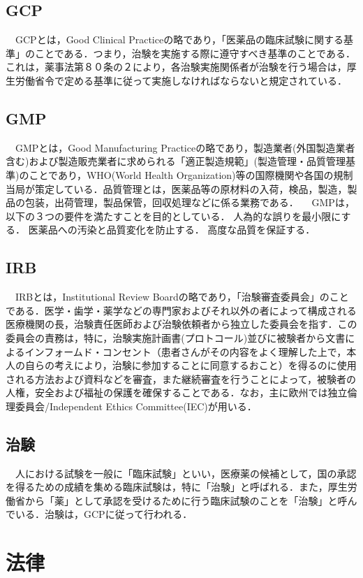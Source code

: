 \documentclass[uplatex,a4paper]{jsarticle}
\begin{document}
\subsection{GCP}
　GCPとは，Good Clinical Practiceの略であり，「医薬品の臨床試験に関する基準」のことである．つまり，治験を実施する際に遵守すべき基準のことである．これは，薬事法第８０条の２により，各治験実施関係者が治験を行う場合は，厚生労働省令で定める基準に従って実施しなければならないと規定されている．

\subsection{GMP}
　GMPとは，Good Manufacturing Practiceの略であり，製造業者(外国製造業者含む)および製造販売業者に求められる「適正製造規範」(製造管理・品質管理基準)のことであり，WHO(World Health Organization)等の国際機関や各国の規制当局が策定している．品質管理とは，医薬品等の原材料の入荷，検品，製造，製品の包装，出荷管理，製品保管，回収処理などに係る業務である．
　GMPは，以下の３つの要件を満たすことを目的としている．
人為的な誤りを最小限にする．
医薬品への汚染と品質変化を防止する．
高度な品質を保証する．

\subsection{IRB}
　IRBとは，Institutional Review Boardの略であり，「治験審査委員会」のことである．医学・歯学・薬学などの専門家およびそれ以外の者によって構成される医療機関の長，治験責任医師および治験依頼者から独立した委員会を指す．この委員会の責務は，特に，治験実施計画書(プロトコール)並びに被験者から文書によるインフォームド・コンセント（患者さんがその内容をよく理解した上で，本人の自らの考えにより，治験に参加することに同意するおこと）を得るのに使用される方法および資料などを審査，また継続審査を行うことによって，被験者の人権，安全および福祉の保護を確保することである．なお，主に欧州では独立倫理委員会/Independent Ethics Committee(IEC)が用いる．

\subsection{治験}
　人における試験を一般に「臨床試験」といい，医療薬の候補として，国の承認を得るための成績を集める臨床試験は，特に「治験」と呼ばれる．また，厚生労働省から「薬」として承認を受けるために行う臨床試験のことを「治験」と呼んでいる．治験は，GCPに従って行われる．



\section{法律}
\end{document}
